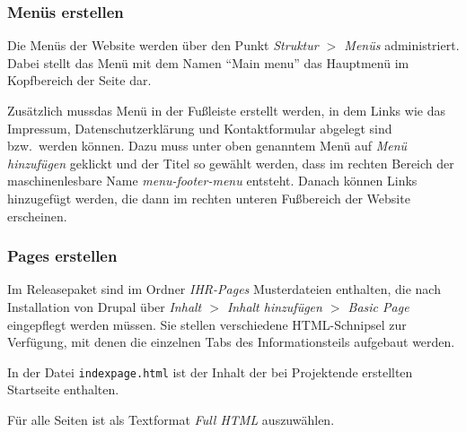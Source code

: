 \documentclass[a4paper,11pt,twoside]{article}
\begin{document}
\subsubsection{Menüs erstellen}
Die Menüs der Website werden über den Punkt \textit{Struktur $>$ Menüs}
administriert. Dabei stellt das Menü mit dem Namen "`Main menu"' das Hauptmenü
im Kopfbereich der Seite dar.

Zusätzlich mussdas Menü in der Fußleiste erstellt werden, in dem Links wie das
Impressum, Datenschutzerklärung und Kontaktformular abgelegt sind bzw.\ werden
können.  Dazu muss unter oben genanntem Menü auf \emph{Menü hinzufügen}
geklickt und der Titel so gewählt werden, dass im rechten Bereich der
maschinenlesbare Name \textit{menu-footer-menu} entsteht. Danach können Links
hinzugefügt werden, die dann im rechten unteren Fußbereich der Website
erscheinen.

\subsubsection{Pages erstellen}
Im Releasepaket sind im Ordner \emph{IHR-Pages} Musterdateien enthalten, die
nach Installation von Drupal über \textit{Inhalt $>$ Inhalt hinzufügen $>$
  Basic Page} eingepflegt werden müssen. Sie stellen verschiedene
HTML-Schnipsel zur Verfügung, mit denen die einzelnen Tabs des
Informationsteils aufgebaut werden.

In der Datei \texttt{indexpage.html} ist der Inhalt der bei Projektende
erstellten Startseite enthalten. 

Für alle Seiten ist als Textformat \emph{Full HTML} auszuwählen.
\end{document}
